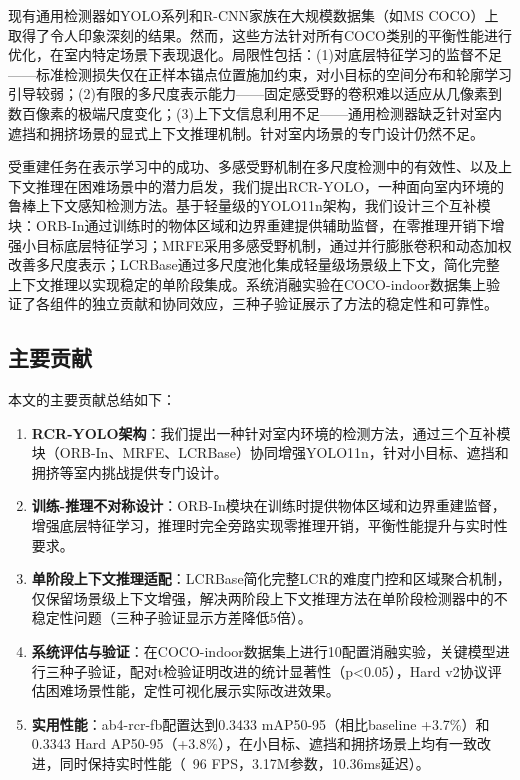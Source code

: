 \documentclass[journal]{IEEEtran}
\begin{document}
现有通用检测器如YOLO系列\cite{redmon2016yolo,bochkovskiy2020yolov4,ultralytics2023yolov8}和R-CNN家族\cite{girshick2014rcnn,ren2015faster}在大规模数据集（如MS COCO\cite{lin2014microsoft}）上取得了令人印象深刻的结果。然而，这些方法针对所有COCO类别的平衡性能进行优化，在室内特定场景下表现退化。局限性包括：(1)对底层特征学习的监督不足——标准检测损失仅在正样本锚点位置施加约束，对小目标的空间分布和轮廓学习引导较弱；(2)有限的多尺度表示能力——固定感受野的卷积难以适应从几像素到数百像素的极端尺度变化；(3)上下文信息利用不足——通用检测器缺乏针对室内遮挡和拥挤场景的显式上下文推理机制。针对室内场景的专门设计仍然不足。

受重建任务在表示学习中的成功、多感受野机制在多尺度检测中的有效性、以及上下文推理在困难场景中的潜力启发，我们提出RCR-YOLO，一种面向室内环境的鲁棒上下文感知检测方法。基于轻量级的YOLO11n架构，我们设计三个互补模块：ORB-In通过训练时的物体区域和边界重建提供辅助监督，在零推理开销下增强小目标底层特征学习；MRFE采用多感受野机制，通过并行膨胀卷积和动态加权改善多尺度表示；LCRBase通过多尺度池化集成轻量级场景级上下文，简化完整上下文推理以实现稳定的单阶段集成。系统消融实验在COCO-indoor数据集上验证了各组件的独立贡献和协同效应，三种子验证展示了方法的稳定性和可靠性。

\subsection{主要贡献}
\label{subsec:contributions}

本文的主要贡献总结如下：

\begin{enumerate}
    \item \textbf{RCR-YOLO架构}：我们提出一种针对室内环境的检测方法，通过三个互补模块（ORB-In、MRFE、LCRBase）协同增强YOLO11n，针对小目标、遮挡和拥挤等室内挑战提供专门设计。

    \item \textbf{训练-推理不对称设计}：ORB-In模块在训练时提供物体区域和边界重建监督，增强底层特征学习，推理时完全旁路实现零推理开销，平衡性能提升与实时性要求。

    \item \textbf{单阶段上下文推理适配}：LCRBase简化完整LCR的难度门控和区域聚合机制，仅保留场景级上下文增强，解决两阶段上下文推理方法在单阶段检测器中的不稳定性问题（三种子验证显示方差降低5倍）。

    \item \textbf{系统评估与验证}：在COCO-indoor数据集上进行10配置消融实验，关键模型进行三种子验证，配对t检验证明改进的统计显著性（p<0.05），Hard v2协议评估困难场景性能，定性可视化展示实际改进效果。

    \item \textbf{实用性能}：ab4-rcr-fb配置达到0.3433 mAP50-95（相比baseline +3.7\%）和0.3343 Hard AP50-95（+3.8\%），在小目标、遮挡和拥挤场景上均有一致改进，同时保持实时性能（~96 FPS，3.17M参数，10.36ms延迟）。
\end{enumerate}
\end{document}
